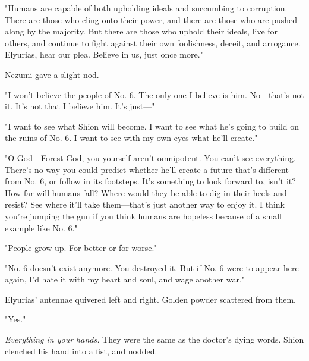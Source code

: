 "Humans are capable of both upholding ideals and succumbing to
corruption. There are those who cling onto their power, and there are
those who are pushed along by the majority. But there are those who
uphold their ideals, live for others, and continue to fight against
their own foolishness, deceit, and arrogance. Elyurias, hear our plea.
Believe in us, just once more."


Nezumi gave a slight nod.


"I won't believe the people of No. 6. The only one I believe is him.
No---that's not it. It's not that I believe him. It's just---"


"I want to see what Shion will become. I want to see what he's going to
build on the ruins of No. 6. I want to see with my own eyes what he'll
create."


"O God---Forest God, you yourself aren't omnipotent. You can't see
everything. There's no way you could predict whether he'll create a
future that's different from No. 6, or follow in its footsteps. It's
something to look forward to, isn't it? How far will humans fall? Where
would they be able to dig in their heels and resist? See where it'll
take them---that's just another way to enjoy it. I think you're jumping
the gun if you think humans are hopeless because of a small example like
No. 6."


"People grow up. For better or for worse."


"No. 6 doesn't exist anymore. You destroyed it. But if No. 6 were to
appear here again, I'd hate it with my heart and soul, and wage another
war."

Elyurias' antennae quivered left and right. Golden powder scattered from
them.


"Yes."


\emph{Everything in your hands.} They were the same as the doctor's dying
words. Shion clenched his hand into a fist, and nodded.

